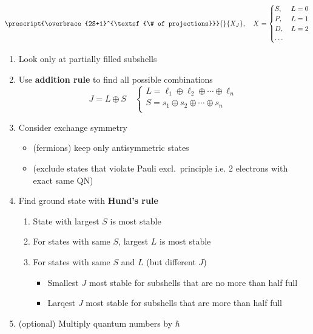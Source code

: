 \noindent\begin{equation*}
    \prescript{\overbrace{2S+1}^{\textsf{\# of projections}}}{}{X_J}, \quad X=
        {\begin{cases}
                S,     & L=0 \\
                P,     & L=1 \\
                D,     & L=2 \\
                \cdots &
            \end{cases}}
\end{equation*}

\begin{enumerate}
    \item Look only at partially filled subshells
    \item Use \textbf{addition rule} to find all possible combinations
          \noindent\begin{equation*}
              J = L\oplus S \quad\begin{cases}
                  L =\ell_1 \oplus\ell_2 \oplus \cdots \oplus\ell_n \\
                  S = s_1 \oplus s_2 \oplus \cdots \oplus s_n       \\
              \end{cases}
          \end{equation*}
    \item Consider exchange symmetry
          \begin{itemize}
              \item (fermions) keep only antisymmetric states
              \item (exclude states that violate Pauli excl.\ principle i.e. 2 electrons with exact same QN)
          \end{itemize}
    \item Find ground state with \textbf{Hund's rule}
          \begin{enumerate}
              \item State with largest $S$ is most stable
              \item For states with same $S$, largest $L$ is most stable
              \item For states with same $S$ and $L$ (but different $J$)
                    \begin{itemize}
                        \item Smallest $J$ most stable for subshells that are no more than half full
                        \item Larqest $J$ most stable for subshells that are more than half full
                    \end{itemize}
          \end{enumerate}
    \item (optional) Multiply quantum numbers by $\hbar$
\end{enumerate}


